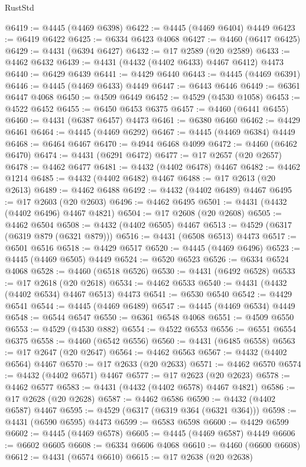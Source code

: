 \begin{lexlean}{RustStd}
\begin{coremodule}
@6419 := @4445 (@4469 @6398)
@6422 := @4445 (@4469 @6404) @4449
@6423 := @6419 @6422
@6425 := @6334 @6423 @4068
@6427 := @4460 (@6417 @6425)
@6429 := @4431 (@6394 @6427)
@6432 := @17 @2589 (@20 @2589)
@6433 := @4462 @6432
@6439 := @4431 (@4432 (@4402 @6433) @4467 @6412) @4473
@6440 := @6429 @6439
@6441 := @4429 @6440
@6443 := @4445 (@4469 @6391)
@6446 := @4445 (@4469 @6433) @4449
@6447 := @6443 @6446
@6449 := @6361 @6447 @4068
@6450 := @4509 @6449
@6452 := @4529 (@4530 @1058)
@6453 := @4522 @6452
@6455 := @6450 @6453 @6375
@6457 := @4460 (@6441 @6455)
@6460 := @4431 (@6387 @6457) @4473
@6461 := @6380 @6460
@6462 := @4429 @6461
@6464 := @4445 (@4469 @6292)
@6467 := @4445 (@4469 @6384) @4449
@6468 := @6464 @6467
@6470 := @4944 @6468 @4099
@6472 := @4460 (@6462 @6470)
@6474 := @4431 (@6291 @6472)
@6477 := @17 @2657 (@20 @2657)
@6478 := @4462 @6477
@6481 := @4432 (@4402 @6478) @4467
@6482 := @4462 @1214
@6485 := @4432 (@4402 @6482) @4467
@6488 := @17 @2613 (@20 @2613)
@6489 := @4462 @6488
@6492 := @4432 (@4402 @6489) @4467
@6495 := @17 @2603 (@20 @2603)
@6496 := @4462 @6495
@6501 := @4431 (@4432 (@4402 @6496) @4467 @4821)
@6504 := @17 @2608 (@20 @2608)
@6505 := @4462 @6504
@6508 := @4432 (@4402 @6505) @4467
@6513 := @4529 (@6317 (@6319 @879 (@6321 @879)))
@6516 := @4431 (@6508 @6513) @4473
@6517 := @6501 @6516
@6518 := @4429 @6517
@6520 := @4445 (@4469 @6496)
@6523 := @4445 (@4469 @6505) @4449
@6524 := @6520 @6523
@6526 := @6334 @6524 @4068
@6528 := @4460 (@6518 @6526)
@6530 := @4431 (@6492 @6528)
@6533 := @17 @2618 (@20 @2618)
@6534 := @4462 @6533
@6540 := @4431 (@4432 (@4402 @6534) @4467 @6513) @4473
@6541 := @6530 @6540
@6542 := @4429 @6541
@6544 := @4445 (@4469 @6489)
@6547 := @4445 (@4469 @6534) @4449
@6548 := @6544 @6547
@6550 := @6361 @6548 @4068
@6551 := @4509 @6550
@6553 := @4529 (@4530 @882)
@6554 := @4522 @6553
@6556 := @6551 @6554 @6375
@6558 := @4460 (@6542 @6556)
@6560 := @4431 (@6485 @6558)
@6563 := @17 @2647 (@20 @2647)
@6564 := @4462 @6563
@6567 := @4432 (@4402 @6564) @4467
@6570 := @17 @2633 (@20 @2633)
@6571 := @4462 @6570
@6574 := @4432 (@4402 @6571) @4467
@6577 := @17 @2623 (@20 @2623)
@6578 := @4462 @6577
@6583 := @4431 (@4432 (@4402 @6578) @4467 @4821)
@6586 := @17 @2628 (@20 @2628)
@6587 := @4462 @6586
@6590 := @4432 (@4402 @6587) @4467
@6595 := @4529 (@6317 (@6319 @364 (@6321 @364)))
@6598 := @4431 (@6590 @6595) @4473
@6599 := @6583 @6598
@6600 := @4429 @6599
@6602 := @4445 (@4469 @6578)
@6605 := @4445 (@4469 @6587) @4449
@6606 := @6602 @6605
@6608 := @6334 @6606 @4068
@6610 := @4460 (@6600 @6608)
@6612 := @4431 (@6574 @6610)
@6615 := @17 @2638 (@20 @2638)

\end{coremodule}
\end{lexlean}
